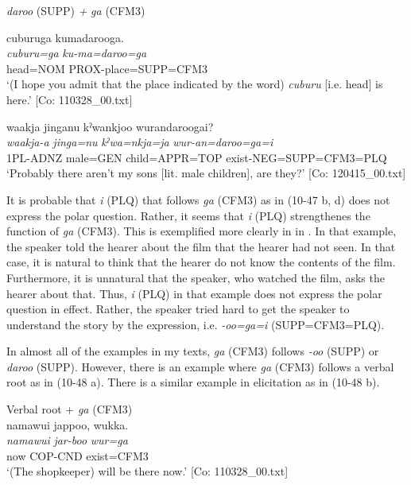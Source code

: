 \begin{xlist}
\begin{xlist}
  \exi{} \textit{daroo} (SUPP) \textit{+} \textit{ga} (CFM3)

  \ex  %
      \glll    cuburuga  kumadarooga.\\
      \textit{cuburu=ga}  \textit{ku-ma=daroo=ga}\\
      head=NOM  PROX-place=SUPP=CFM3\\
      \glt       ‘(I hope you admit that the place indicated by the word) \textit{cuburu} [i.e. head] is here.’ [Co: 110328\_00.txt]

  \ex  %
      \glll    waakja  jinganu  kˀwankjoo  wurandaroogai?\\
      \textit{waakja-a}  \textit{jinga=nu}  \textit{kˀwa=nkja=ja}  \textit{wur-an=daroo=ga=i}\\
      1PL-ADNZ  male=GEN  child=APPR=TOP  exist-NEG=SUPP=CFM3=PLQ\\
      \glt       ‘Probably there aren’t my sons [lit. male children], are they?’ [Co: 120415\_00.txt]
    \end{xlist}
\z

It is probable that \textit{i} (PLQ) that follows \textit{ga} (CFM3) as in (10-47 b, d) does not express the polar question. Rather, it seems that \textit{i} (PLQ) strengthenes the function of \textit{ga} (CFM3). This is exemplified more clearly in  in . In that example, the speaker told the hearer about the film that the hearer had not seen. In that case, it is natural to think that the hearer do not know the contents of the film. Furthermore, it is unnatural that the speaker, who watched the film, asks the hearer about that. Thus, \textit{i} (PLQ) in that example does not express the polar question in effect. Rather, the speaker tried hard to get the speaker to understand the story by the expression, i.e. \textit{{}-oo=ga=i} (SUPP=CFM3=PLQ).

In almost all of the examples in my texts, \textit{ga} (CFM3) follows \textit{-oo} (SUPP) or \textit{daroo} (SUPP). However, there is an example where \textit{ga} (CFM3) follows a verbal root as in (10-48 a). There is a similar example in elicitation as in (10-48 b).

\ea\label{ex:10.48}   Verbal root + \textit{ga} (CFM3)\\
  \ea  %
      \glll    namawui  jappoo,  wukka.\\
      \textit{namawui}  \textit{jar-boo}  \textit{wur=ga}\\
      now  COP-CND  exist=CFM3\\
      \glt       ‘(The shopkeeper) will be there now.’ [Co: 110328\_00.txt]


\end{xlist}
